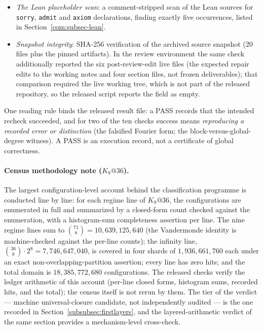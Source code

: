\begin{itemize}[leftmargin=1.8em]
witness, confirming that $\EV(G)\cong K_{1,5}$ has a vertex of E-degree $5$
while every block of $\EV(G)$ is a single edge (maximum degree $1$).
\item \emph{The Lean placeholder scan}: a comment-stripped scan of the Lean
sources for \texttt{sorry}, \texttt{admit} and \texttt{axiom}
declarations, finding exactly five occurrences, listed in
Section~\ref{com:subsec-lean}.
\item \emph{Snapshot integrity}: SHA-256 verification of the archived source
snapshot (20 files plus the pinned artifacts). In the review environment the
same check additionally reported the six post-review-edit live files (the
expected repair edits to the working notes and four section files, not frozen
deliverables); that comparison required the live working tree, which is not
part of the released repository, so the released script reports the field as
empty.
\end{itemize}

One reading rule binds the released result file: a PASS records that the
intended recheck succeeded, and for two of the ten checks success means
\emph{reproducing a recorded error or distinction} (the falsified Fourier
form; the block-versus-global-degree witness). A PASS is an execution
record, not a certificate of global correctness.

\paragraph{Census methodology note ($K_9@36$).} The largest
configuration-level account behind the classification programme is
conducted line by line: for each regime line of $K_9@36$, the
configurations are enumerated in full and summarized by a closed-form
count checked against the enumeration, with a histogram-sum completeness
assertion per line. The nine regime lines sum to
$\binom{71}{8}=10{,}639{,}125{,}640$ (the Vandermonde identity is
machine-checked against the per-line counts); the infinity line,
$\binom{36}{8}\cdot2^8=7{,}746{,}647{,}040$, is covered in four shards of
$1{,}936{,}661{,}760$ each under an exact non-overlapping-partition
assertion; every line has zero hits; and the total domain is
$18{,}385{,}772{,}680$ configurations. The released checks verify the
ledger arithmetic of this account (per-line closed forms, histogram sums,
recorded hits, and the total); the census itself is not rerun by them.
The tier of the verdict --- machine universal-closure candidate, not
independently audited --- is the one recorded in
Section~\ref{subsubsec:firstlayers}, and the layered-arithmetic verdict of
the same section provides a mechanism-level cross-check.

